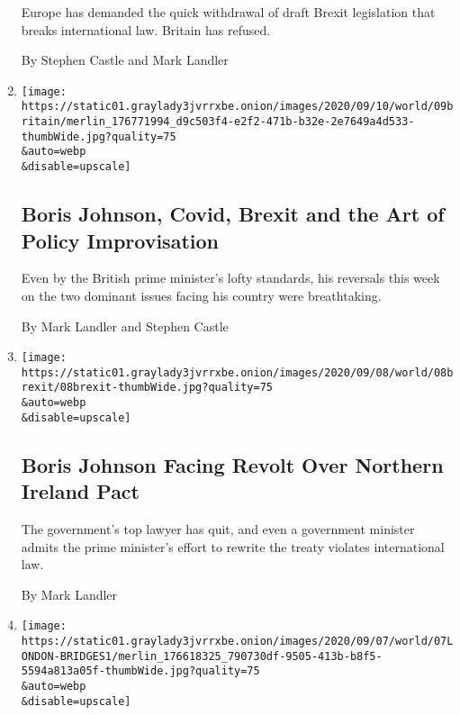 \begin{enumerate}
  Europe has demanded the quick withdrawal of draft Brexit legislation
  that breaks international law. Britain has refused.

  By Stephen Castle and Mark Landler
\item
  \href{/2020/09/09/world/europe/boris-johnson-brexit-coronavirus.html}{}

  \texttt{[image: https://static01.graylady3jvrrxbe.onion/images/2020/09/10/world/09britain/merlin\_176771994\_d9c503f4-e2f2-471b-b32e-2e7649a4d533-thumbWide.jpg?quality=75\\\&auto=webp\\\&disable=upscale]}

  \hypertarget{boris-johnson-covid-brexit-and-the-art-of-policy-improvisation}{%
  \subsection{Boris Johnson, Covid, Brexit and the Art of Policy
  Improvisation}\label{boris-johnson-covid-brexit-and-the-art-of-policy-improvisation}}

  Even by the British prime minister's lofty standards, his reversals
  this week on the two dominant issues facing his country were
  breathtaking.

  By Mark Landler and Stephen Castle
\item
  \href{/2020/09/08/world/europe/boris-johnson-brexit-northern-ireland.html}{}

  \texttt{[image: https://static01.graylady3jvrrxbe.onion/images/2020/09/08/world/08brexit/08brexit-thumbWide.jpg?quality=75\\\&auto=webp\\\&disable=upscale]}

  \hypertarget{boris-johnson-facing-revolt-over-northern-ireland-pact}{%
  \subsection{Boris Johnson Facing Revolt Over Northern Ireland
  Pact}\label{boris-johnson-facing-revolt-over-northern-ireland-pact}}

  The government's top lawyer has quit, and even a government minister
  admits the prime minister's effort to rewrite the treaty violates
  international law.

  By Mark Landler
\item
  \href{/2020/09/07/world/europe/london-bridges.html}{}

  \texttt{[image: https://static01.graylady3jvrrxbe.onion/images/2020/09/07/world/07LONDON-BRIDGES1/merlin\_176618325\_790730df-9505-413b-b8f5-5594a813a05f-thumbWide.jpg?quality=75\\\&auto=webp\\\&disable=upscale]}


\end{enumerate}
